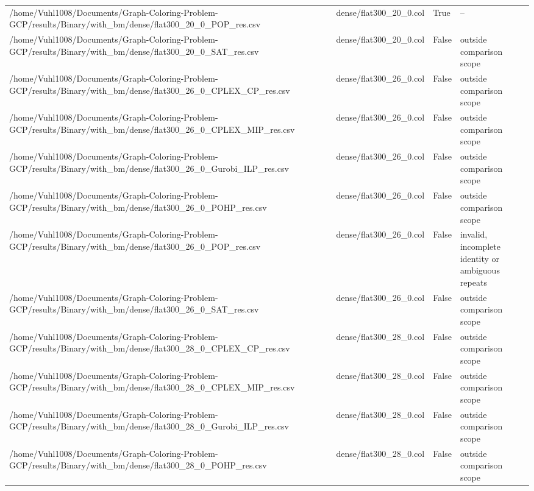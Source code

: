 \begin{table}[htbp]
\begin{tabular}{llll}
/home/Vuhl1008/Documents/Graph-Coloring-Problem-GCP/results/Binary/with\_bm/dense/flat300\_20\_0\_POP\_res.csv & dense/flat300\_20\_0.col & True & -- \\
/home/Vuhl1008/Documents/Graph-Coloring-Problem-GCP/results/Binary/with\_bm/dense/flat300\_20\_0\_SAT\_res.csv & dense/flat300\_20\_0.col & False & outside comparison scope \\
/home/Vuhl1008/Documents/Graph-Coloring-Problem-GCP/results/Binary/with\_bm/dense/flat300\_26\_0\_CPLEX\_CP\_res.csv & dense/flat300\_26\_0.col & False & outside comparison scope \\
/home/Vuhl1008/Documents/Graph-Coloring-Problem-GCP/results/Binary/with\_bm/dense/flat300\_26\_0\_CPLEX\_MIP\_res.csv & dense/flat300\_26\_0.col & False & outside comparison scope \\
/home/Vuhl1008/Documents/Graph-Coloring-Problem-GCP/results/Binary/with\_bm/dense/flat300\_26\_0\_Gurobi\_ILP\_res.csv & dense/flat300\_26\_0.col & False & outside comparison scope \\
/home/Vuhl1008/Documents/Graph-Coloring-Problem-GCP/results/Binary/with\_bm/dense/flat300\_26\_0\_POHP\_res.csv & dense/flat300\_26\_0.col & False & outside comparison scope \\
/home/Vuhl1008/Documents/Graph-Coloring-Problem-GCP/results/Binary/with\_bm/dense/flat300\_26\_0\_POP\_res.csv & dense/flat300\_26\_0.col & False & invalid, incomplete identity or ambiguous repeats \\
/home/Vuhl1008/Documents/Graph-Coloring-Problem-GCP/results/Binary/with\_bm/dense/flat300\_26\_0\_SAT\_res.csv & dense/flat300\_26\_0.col & False & outside comparison scope \\
/home/Vuhl1008/Documents/Graph-Coloring-Problem-GCP/results/Binary/with\_bm/dense/flat300\_28\_0\_CPLEX\_CP\_res.csv & dense/flat300\_28\_0.col & False & outside comparison scope \\
/home/Vuhl1008/Documents/Graph-Coloring-Problem-GCP/results/Binary/with\_bm/dense/flat300\_28\_0\_CPLEX\_MIP\_res.csv & dense/flat300\_28\_0.col & False & outside comparison scope \\
/home/Vuhl1008/Documents/Graph-Coloring-Problem-GCP/results/Binary/with\_bm/dense/flat300\_28\_0\_Gurobi\_ILP\_res.csv & dense/flat300\_28\_0.col & False & outside comparison scope \\
/home/Vuhl1008/Documents/Graph-Coloring-Problem-GCP/results/Binary/with\_bm/dense/flat300\_28\_0\_POHP\_res.csv & dense/flat300\_28\_0.col & False & outside comparison scope \\

\end{tabular}
\end{table}

